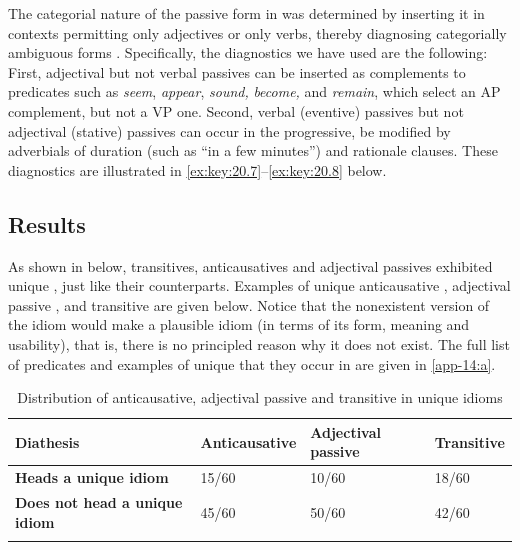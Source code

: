 \documentclass[output=paper]{langsci/langscibook}
\begin{document}
The categorial nature of the passive form in  was determined by inserting
it in contexts permitting only adjectives or only verbs, thereby diagnosing
categorially ambiguous forms \parencite[see][]{Wasow1977}.  Specifically, the
diagnostics we have used are the following: First, adjectival but not verbal
passives can be inserted as complements to predicates such as \emph{seem},
\emph{appear}, \emph{sound,} \emph{become,} and \emph{remain}, which select an
AP complement, but not a VP one. Second, verbal (eventive) passives but not
adjectival (stative) passives can occur in the progressive, be modified by
adverbials of duration (such as ``in a few minutes'') and rationale clauses.
These diagnostics are illustrated in \eqref{ex:key:20.7}--\eqref{ex:key:20.8} below.

\ea\label{ex:key:20.7}
    \z
\z

\largerpage[2]
\ea\label{ex:key:20.8}
    \z
\z

\subsection{Results}  %

As shown in  below, transitives, anticausatives and
adjectival passives exhibited unique , just like their 
counterparts. Examples of unique anticausative , adjectival
passive , and transitive   are given below.
Notice that the nonexistent version of the idiom would make a plausible idiom
(in terms of its form, meaning and usability), that is, there is no principled
reason why it does not exist. The full list of predicates and examples of
unique  that they occur in are given in \ref{app-14:a}.

\begin{table}
\caption{Distribution of anticausative, adjectival passive
and transitive in unique idioms}\label{tab:key:20.1}
\begin{tabularx}{\textwidth}{lXXX}
\lsptoprule
{\bfseries Diathesis} & {\bfseries Anticausative} & {\bfseries Adjectival passive} & {\bfseries Transitive}\\
\midrule
{\bfseries Heads a unique idiom} & 15/60 & 10/60 & 18/60\\
{\bfseries Does not head a unique idiom} & 45/60 & 50/60 & 42/60\\
\lspbottomrule
\end{tabularx}
\end{table}
\end{document}
